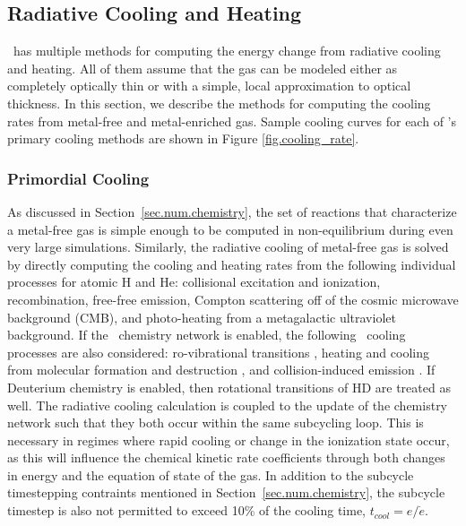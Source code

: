 \subsection{Radiative Cooling and Heating}
\label{sec.num.cooling}

\enzo\ has multiple methods for computing the energy change from radiative
cooling and heating.  All of them assume that the gas can be modeled either as
completely optically thin or with a simple, local approximation to optical
thickness.  In this section, we describe the methods for computing the cooling rates from
metal-free and metal-enriched gas.  Sample cooling curves for each of \enzo's
primary cooling methods are shown in Figure \ref{fig.cooling_rate}.

\subsubsection{Primordial Cooling}

As discussed in Section~\ref{sec.num.chemistry}, the set of reactions that
characterize a metal-free gas is simple enough to be computed in
non-equilibrium during even very large simulations.  Similarly, the radiative
cooling of metal-free gas is solved by directly computing the cooling
and heating rates from the following individual processes for atomic H
and He: collisional excitation and ionization, recombination,
free-free emission, Compton scattering off of the cosmic microwave
background (CMB), and photo-heating from a metagalactic ultraviolet background.
If the \HH~chemistry network is enabled, the following \HH~cooling 
processes are also considered: ro-vibrational transitions
\citep{2008MNRAS.388.1627G,1998A&A...335..403G}, heating and cooling from molecular
formation and destruction \citep{2009Sci...325..601T}, and
collision-induced emission \citep{2004MNRAS.348.1019R}.  If Deuterium
chemistry is enabled, then rotational transitions of HD
\citep{1998A&A...335..403G, 1983ApJ...270..578L} are treated as well.  The
radiative cooling calculation is coupled to the update of the chemistry network
such that they both occur within the same subcycling loop.  This is necessary
in regimes where rapid cooling or change in the ionization state occur, as this
will influence the chemical kinetic rate coefficients through both changes in
energy and the equation of state of the gas.  In addition to the subcycle
timestepping contraints mentioned in Section~\ref{sec.num.chemistry}, the
subcycle timestep is also not permitted to exceed 10\% of the cooling time,
$t_{cool} = e/\dot{e}$.  

